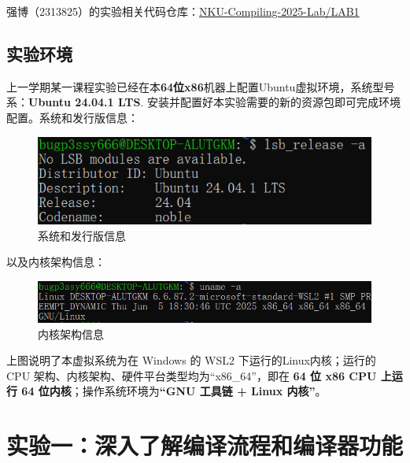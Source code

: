 \documentclass[UTF8,a4paper,10pt]{ctexart}
\begin{document}
强博（2313825）的实验相关代码仓库：\href{https://github.com/RecA123/NKU-Compiling-2025-Lab/tree/main/LAB1}{NKU-Compiling-2025-Lab/LAB1}

\vspace{1em}


\subsection{实验环境}

上一学期某一课程实验已经在本\textbf{64位x86}机器上配置Ubuntu虚拟环境，系统型号系：\textbf{Ubuntu 24.04.1 LTS}. 安装并配置好本实验需要的新的资源包即可完成环境配置。系统和发行版信息：
\begin{figure} [H]
    \centering
    \includegraphics[width=0.6\linewidth]{sys.png}
    \caption{系统和发行版信息}
    \label{fig:placeholder}
\end{figure}

以及内核架构信息：
\begin{figure} [H]
    \centering
    \includegraphics[width=0.75\linewidth]{struct.png}
    \caption{内核架构信息}
    \label{fig:placeholder}
\end{figure}

上图说明了本虚拟系统为在 Windows 的 WSL2 下运行的Linux内核；运行的 CPU 架构、内核架构、硬件平台类型均为“x86\_64”，即在 \textbf{64 位 x86 CPU 上运行 64 位内核}；操作系统环境为\textbf{“GNU 工具链 + Linux 内核”}。



\vspace{3em}

\section{实验一：深入了解编译流程和编译器功能}
\end{document}
